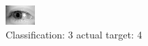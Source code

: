 \begin{figure}[h!]
\begin{center}
\includegraphics[width=0.60\columnwidth]{figures/ID3265_class_3_target_4.png}
\end{center}
\caption{ Classification: 3 actual target: 4}
\label{fig:ID3265_class_3_target_4}
\end{figure}
